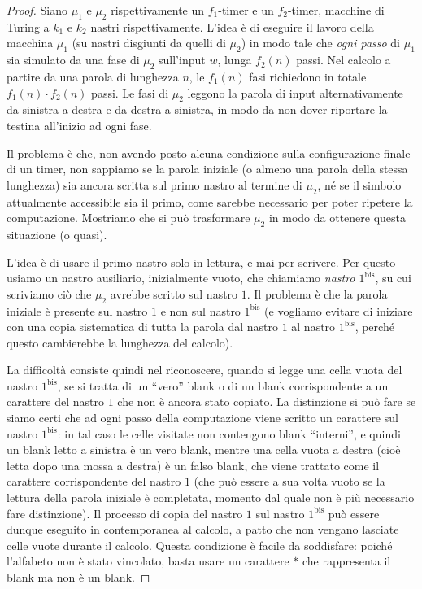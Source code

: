 \begin{proof}
Siano $\mu_1$ e $\mu_2$ rispettivamente un $f_1$-timer e un $f_2$-timer, macchine di Turing a $k_1$ e $k_2$ nastri rispettivamente. L'idea è di eseguire il lavoro della macchina $\mu_1$ (su nastri disgiunti da quelli di $\mu_2$) in modo tale che \emph{ogni passo} di $\mu_1$ sia simulato da una fase di $\mu_2$ sull'input $w$, lunga $f_2(n)$ passi. Nel calcolo a partire da una parola di lunghezza $n$, le $f_1(n)$ fasi richiedono in totale $f_1(n)\cdot f_2(n)$ passi. Le fasi di $\mu_2$ leggono la parola di input alternativamente da sinistra a destra e da destra a sinistra, in modo da non dover riportare la testina all'inizio ad ogni fase.

Il problema è che, non avendo posto alcuna condizione sulla configurazione finale di un timer, non sappiamo se la parola iniziale (o almeno una parola della stessa lunghezza) sia ancora scritta sul primo nastro al termine di $\mu_2$, né se il simbolo attualmente accessibile sia il primo, come sarebbe necessario per poter ripetere la computazione. Mostriamo che si può trasformare $\mu_2$ in modo da ottenere questa situazione (o quasi).

L'idea è di usare il primo nastro solo in lettura, e mai per scrivere. Per questo usiamo un nastro ausiliario, inizialmente vuoto, che chiamiamo \emph{nastro $1^{\mathrm{bis}}$}, su cui scriviamo ciò che $\mu_2$ avrebbe scritto sul nastro $1$. Il problema è che la parola iniziale è presente sul nastro $1$ e non sul nastro $1^{\mathrm{bis}}$ (e vogliamo evitare di iniziare con una copia sistematica di tutta la parola dal nastro $1$ al nastro $1^{\mathrm{bis}}$, perché questo cambierebbe la lunghezza del calcolo).

La difficoltà consiste quindi nel riconoscere, quando si legge una cella vuota del nastro $1^{\mathrm{bis}}$, se si tratta di un ``vero'' blank o di un blank corrispondente a un carattere del nastro $1$ che non è ancora stato copiato. La distinzione si può fare se siamo certi che ad ogni passo della computazione viene scritto un carattere sul nastro $1^{\mathrm{bis}}$: in tal caso le celle visitate non contengono blank ``interni'', e quindi un blank letto a sinistra è un vero blank, mentre una cella vuota a destra (cioè letta dopo una mossa a destra) è un falso blank, che viene trattato come il carattere corrispondente del nastro $1$ (che può essere a sua volta vuoto se la lettura della parola iniziale è completata, momento dal quale non è più necessario fare distinzione). Il processo di copia del nastro $1$ sul nastro $1^{\mathrm{bis}}$ può essere dunque eseguito in contemporanea al calcolo, a patto che non vengano lasciate celle vuote durante il calcolo. Questa condizione è facile da soddisfare: poiché l'alfabeto non è stato vincolato, basta usare un carattere $*$ che rappresenta il blank ma non è un blank.


\end{proof}

